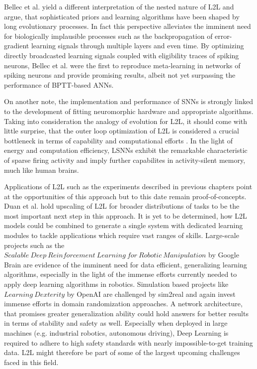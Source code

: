 \documentclass[letterpaper, 10 pt, conference]{ieeeconf}  %
\begin{document}
Bellec et al.\cite{bellecLongShorttermMemory2018} yield a different interpretation of the nested nature of L2L and argue, that 
sophisticated priors and learning algorithms have been
shaped by long evolutionary processes. In fact this perspective alleviates the imminent need for biologically implausible processes such as the 
backpropagation of error-gradient learning signals through multiple layers and even time. By optimizing directly broadcasted learning signals coupled
with eligibility traces of spiking neurons, Bellec et al. were the first to reproduce meta-learning in networks of spiking neurons and provide 
promising results, albeit not yet surpassing the performance of BPTT-based ANNs. \newline

On another note, the implementation and performance of SNNs is strongly linked to the development of fitting neuromorphic hardware and appropriate
algorithms. Taking into consideration the analogy of evolution for L2L, it should come with little surprise, that the outer loop optimization of L2L 
is considered a crucial bottleneck in terms of capability and computational efforts \cite{duanBenchmarkingDeepReinforcement}. 
In the light of energy and computation efficiency, 
LSNNs exhibit the remarkable characteristic of sparse firing activity and imply further capabilites in activity-silent memory, much like 
human brains. \newline

Applications of L2L such as the experiments described in previous chapters point at the opportunities of this approach but to this date remain
proof-of-concepts. Duan et al.\cite{duanRLFastReinforcement2016} hold upscaling of L2L for broader distributions of tasks to be 
the most important next step in this approach. It 
is yet to be determined, how L2L models could be combined to generate a single system with dedicated learning modules to tackle applications which 
require vast ranges of skills.
Large-scale projects such as the $Scalable\ Deep\ Reinforcement\ 
Learning\ for\ Robotic\ Manipulation$ by Google Brain\cite{ScalableDeepReinforcement} are evidence of the imminent need for data efficient, 
generalizing learning algorithms, 
especially in the light of the immense efforts currently needed to 
apply deep learning algorithms in robotics. Simulation based projects like $Learning\ Dexterity$ by OpenAI \cite{LearningDexterity2018} 
are challenged by sim2real and 
again invest immense efforts in domain randomization approaches. A network architecture, that promises greater generalization ability could hold 
answers for better results in terms of stability and safety as well. Especially when deployed in large machines 
(e.g. industrial robotics, autonomous driving),
Deep Learning is required to adhere to high safety standards with nearly impossible-to-get training data. 
L2L might therefore be part of some of 
the largest upcoming challenges faced in this field.
\end{document}
